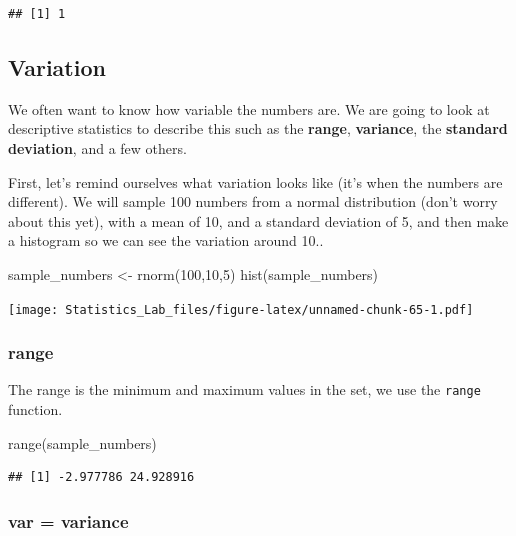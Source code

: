 \documentclass[
]{book}
\newenvironment{Shaded}{\begin{snugshade}}{\end{snugshade}}
\newcommand{\DecValTok}[1]{\textcolor[rgb]{0.00,0.00,0.81}{#1}}
\newcommand{\FunctionTok}[1]{\textcolor[rgb]{0.00,0.00,0.00}{#1}}
\newcommand{\NormalTok}[1]{#1}
\newcommand{\OtherTok}[1]{\textcolor[rgb]{0.56,0.35,0.01}{#1}}
\begin{document}
\begin{verbatim}
## [1] 1
\end{verbatim}

\hypertarget{variation}{%
\subsection{Variation}\label{variation}}

We often want to know how variable the numbers are. We are going to look at descriptive statistics to describe this such as the \textbf{range}, \textbf{variance}, the \textbf{standard deviation}, and a few others.

First, let's remind ourselves what variation looks like (it's when the numbers are different). We will sample 100 numbers from a normal distribution (don't worry about this yet), with a mean of 10, and a standard deviation of 5, and then make a histogram so we can see the variation around 10..

\begin{Shaded}
\begin{Highlighting}[]
\NormalTok{sample\_numbers }\OtherTok{\textless{}{-}} \FunctionTok{rnorm}\NormalTok{(}\DecValTok{100}\NormalTok{,}\DecValTok{10}\NormalTok{,}\DecValTok{5}\NormalTok{)}
\FunctionTok{hist}\NormalTok{(sample\_numbers)}
\end{Highlighting}
\end{Shaded}

\texttt{[image: Statistics\_Lab\_files/figure-latex/unnamed-chunk-65-1.pdf]}

\hypertarget{range}{%
\subsubsection{range}\label{range}}

The range is the minimum and maximum values in the set, we use the \texttt{range} function.

\begin{Shaded}
\begin{Highlighting}[]
\FunctionTok{range}\NormalTok{(sample\_numbers)}
\end{Highlighting}
\end{Shaded}

\begin{verbatim}
## [1] -2.977786 24.928916
\end{verbatim}

\hypertarget{var-variance}{%
\subsubsection{var = variance}\label{var-variance}}
\end{document}
